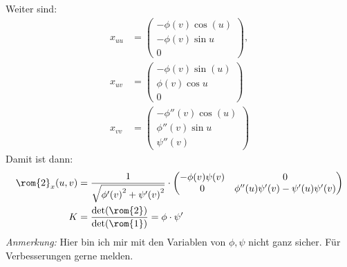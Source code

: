\begin{solution}
\begin{enumerate}[label= (\alph*)]
\begin{equation*}
    \end{equation*}
    Weiter sind:
    \begin{align*}
      x_{uu} &= \begin{pmatrix}
        -\phi(v)\cos(u) \\
        -\phi(v) \sin u \\
        0
      \end{pmatrix}, \\
      x_{uv} &= \begin{pmatrix}
        -\phi(v)\sin(u) \\
        \phi(v) \cos u \\
        0
      \end{pmatrix} \\
      x_{vv} &= \begin{pmatrix}
        -\phi''(v)\cos(u) \\
        \phi''(v) \sin u \\
        \psi''(v)
      \end{pmatrix} 
    \end{align*}
    Damit ist dann: 
    \begin{align*}
      \rom{2}_x(u,v) &= \frac{1}{\sqrt{ {\phi'(v)}^2 + {\psi'(v)}^2}} \cdot \begin{pmatrix}
        -\phi(v) \psi(v) & 0 \\
        0 & \phi''(u) \psi'(v) - \psi'(u)\psi'(v)
      \end{pmatrix} \\ 
      K &= \frac{\det(\rom{2})}{\det(\rom{1})} = \phi \cdot \psi'
    \end{align*}
    \emph{Anmerkung:} Hier bin ich mir mit den Variablen von \( \phi, \psi \) nicht ganz sicher. Für Verbesserungen gerne melden.
    

\end{enumerate}
\end{solution}
